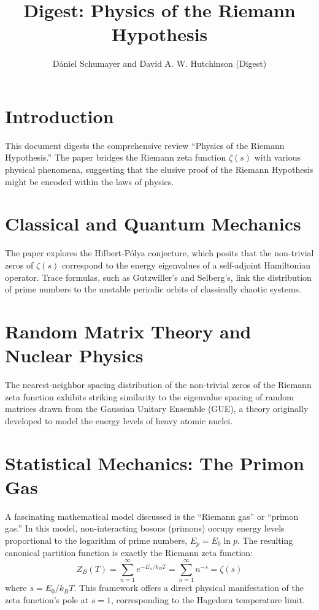 \documentclass{article}
\begin{document}
\title{Digest: Physics of the Riemann Hypothesis}
\author{D\'aniel Schumayer and David A. W. Hutchinson (Digest)}
\maketitle

\section{Introduction}
This document digests the comprehensive review ``Physics of the Riemann Hypothesis.'' The paper bridges the Riemann zeta function $\zeta(s)$ with various physical phenomena, suggesting that the elusive proof of the Riemann Hypothesis might be encoded within the laws of physics.

\section{Classical and Quantum Mechanics}
The paper explores the Hilbert-P\'olya conjecture, which posits that the non-trivial zeros of $\zeta(s)$ correspond to the energy eigenvalues of a self-adjoint Hamiltonian operator. Trace formulas, such as Gutzwiller's and Selberg's, link the distribution of prime numbers to the unstable periodic orbits of classically chaotic systems.

\section{Random Matrix Theory and Nuclear Physics}
The nearest-neighbor spacing distribution of the non-trivial zeros of the Riemann zeta function exhibits striking similarity to the eigenvalue spacing of random matrices drawn from the Gaussian Unitary Ensemble (GUE), a theory originally developed to model the energy levels of heavy atomic nuclei.

\section{Statistical Mechanics: The Primon Gas}
A fascinating mathematical model discussed is the ``Riemann gas'' or ``primon gas.'' In this model, non-interacting bosons (primons) occupy energy levels proportional to the logarithm of prime numbers, $E_p = E_0 \ln p$. The resulting canonical partition function is exactly the Riemann zeta function:
\begin{equation}
Z_B(T) = \sum_{n=1}^\infty e^{-E_n / k_B T} = \sum_{n=1}^\infty n^{-s} = \zeta(s)
\end{equation}
where $s = E_0 / k_B T$. This framework offers a direct physical manifestation of the zeta function's pole at $s=1$, corresponding to the Hagedorn temperature limit.
\end{document}
